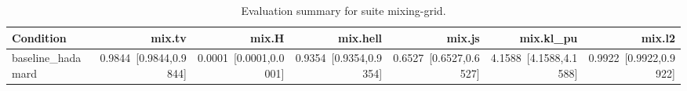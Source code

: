 \begin{table}[t]
\centering
\caption{Evaluation summary for suite mixing-grid.}
\label{tab:eval_mixing-grid}
\begin{tabular}{lrrrrrr}
\toprule
Condition & mix.tv & mix.H & mix.hell & mix.js & mix.kl\_pu & mix.l2 \\
\midrule
baseline\_hadamard & 0.9844~[0.9844,0.9844] & 0.0001~[0.0001,0.0001] & 0.9354~[0.9354,0.9354] & 0.6527~[0.6527,0.6527] & 4.1588~[4.1588,4.1588] & 0.9922~[0.9922,0.9922] \\
\bottomrule
\end{tabular}
\end{table}
